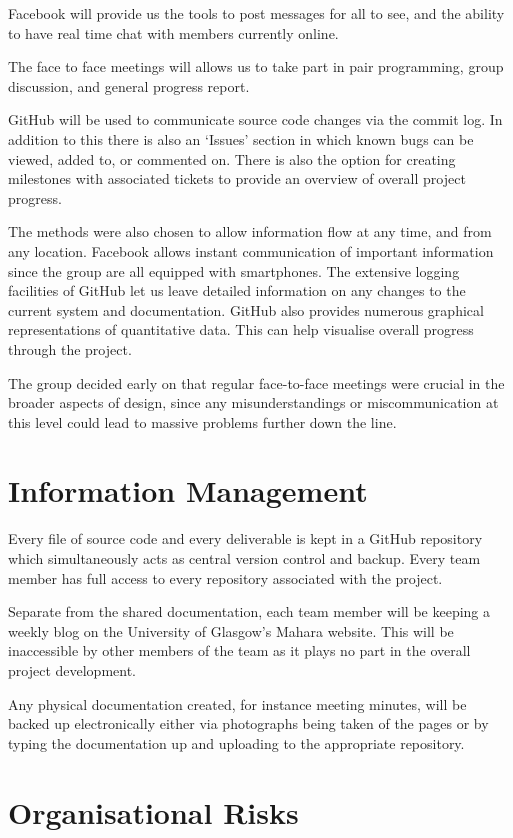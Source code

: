 \documentclass{l3deliverable}
\begin{document}
Facebook will provide us the tools to post messages for all to see, and the
ability to have real time chat with members currently online.

The face to face meetings will allows us to take part in pair programming,
group discussion, and general progress report.

GitHub will be used to communicate source code changes via the commit log. In
addition to this there is also an `Issues' section in which known bugs can be
viewed, added to, or commented on. There is also the option for creating
milestones with associated tickets to provide an overview of overall project
progress.

The methods were also chosen to allow information flow at any time, and from
any location. Facebook allows instant communication of important information
since the group are all equipped with smartphones. The extensive logging
facilities of GitHub let us leave detailed information on any changes to the
current system and documentation. GitHub also provides numerous graphical
representations of quantitative data. This can help visualise overall
progress through the project.

The group decided early on that regular face-to-face meetings were crucial
in the broader aspects of design, since any misunderstandings or
miscommunication at this level could lead to massive problems further down
the line.

\section{Information Management}

Every file of source code and every deliverable is kept in a GitHub repository
which simultaneously acts as central version control and backup. Every
team member has full access to every repository associated with the project.

Separate from the shared documentation, each team member will be keeping a
weekly blog on the University of Glasgow's Mahara website. This will be
inaccessible by other members of the team as it plays no part in the overall
project development.

Any physical documentation created, for instance meeting minutes, will be
backed up electronically either via photographs being taken of the pages or
by typing the documentation up and uploading to the appropriate repository.

\section{Organisational Risks}
\end{document}

